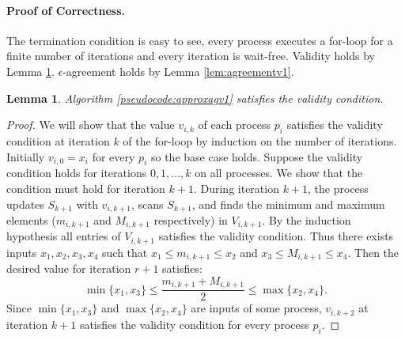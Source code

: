 \documentclass[11pt]{article}
\newtheorem{lemma}[theorem]{Lemma}
\begin{document}
\paragraph{Proof of Correctness.} The termination condition is easy to see, every process executes a for-loop for a finite number of iterations and every iteration is wait-free. Validity holds by Lemma \ref{lem:validityv1}. $\epsilon$-agreement holds by Lemma \ref{lem:agreementv1}. 

\begin{lemma}
\label{lem:validityv1}
Algorithm \ref{pseudocode:approxagv1} satisfies the validity condition. 
\end{lemma}
\begin{proof}
We will show that the value $v_{i,k}$ of each process $p_i$ satisfies the validity condition at iteration $k$ of the for-loop by induction on the number of iterations. Initially $v_{i,0} = x_i$ for every $p_i$ so the base case holds. Suppose the validity condition holds for iterations $0, 1, ..., k$ on all processes. We show that the condition must hold for iteration $k+1$. During iteration $k+1$, the process updates $S_{k+1}$ with $v_{i,k+1}$, scans $S_{k+1}$, and finds the minimum and maximum elements ($m_{i,k+1}$ and $M_{i,k+1}$ respectively) in $V_{i,k+1}$. By the induction hypothesis all entries of $V_{i,k+1}$ satisfies the validity condition. Thus there exists inputs $x_1, x_2, x_3, x_4$ such that $x_1 \leq m_{i,k+1} \leq x_2$ and $x_3 \leq M_{i,k+1} \leq x_4$. Then the desired value for iteration $r+1$ satisfies:
\[\min\{x_1, x_3\} \leq \frac{m_{i,k+1} + M_{i,k+1}}{2} \leq \max\{x_2, x_4\}.\]
Since $\min\{x_1, x_3\}$ and $\max\{x_2, x_4\}$ are inputs of some process, $v_{i,k+2}$ at iteration $k+1$ satisfies the validity condition for every process $p_i$.
\end{proof}
\end{document}
